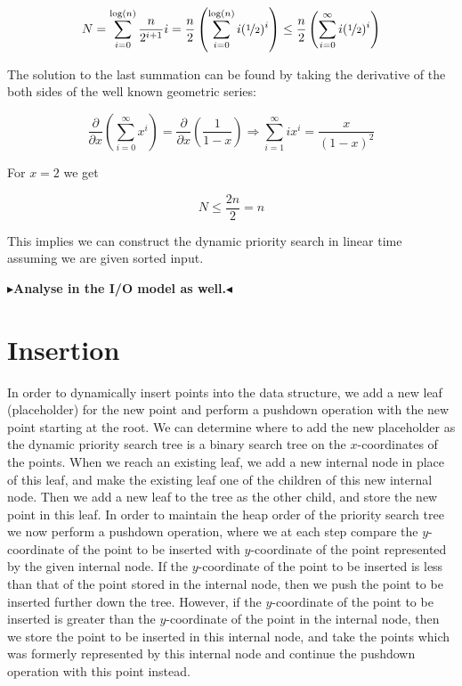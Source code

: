 \documentclass[twoside,11pt,openright]{report}
\newcommand{\todo}[1]{{\color[rgb]{.5,0,0}\textbf{$\blacktriangleright$#1$\blacktriangleleft$}}}
\begin{document}
$$ N = \sum\limits_{i=0}^{\log(n)} \frac{n}{2^{i+1}}i = \frac{n}{2} \left( \sum\limits_{i=0}^{\log(n)} i(\nicefrac{1}{2})^i \right) \leq \frac{n}{2} \left( \sum\limits_{i=0}^{\infty} i(\nicefrac{1}{2})^i \right)$$

The solution to the last summation can be found by taking the derivative of the both sides of the well known geometric series:

$$ \frac{\partial}{\partial x} \left( \sum\limits_{i=0}^{\infty} x^i \right) = \frac{\partial}{\partial x} \left( \frac{1}{1-x} \right) \Rightarrow \sum_{i=1}^{\infty} ix^i = \frac{x}{(1-x)^2} $$

For $x = 2$ we get

$$N \leq \frac{2n}{2} = n $$

This implies we can construct the dynamic priority search in linear time assuming we are given sorted input.

\todo{Analyse in the I/O model as well.}

\section{Insertion}

In order to dynamically insert points into the data structure, we add a new leaf (placeholder) for the new point and perform a pushdown operation with the new point starting at the root. We can determine where to add the new placeholder as the dynamic priority search tree is a binary search tree on the $x$-coordinates of the points. When we reach an existing leaf, we add a new internal node in place of this leaf, and make the existing leaf one of the children of this new internal node. Then we add a new leaf to the tree as the other child, and store the new point in this leaf. In order to maintain the heap order of the priority search tree we now perform a pushdown operation, where we at each step compare the $y$-coordinate of the point to be inserted with $y$-coordinate of the point represented by the given internal node. If the $y$-coordinate of the point to be inserted is less than that of the point stored in the internal node, then we push the point to be inserted further down the tree. However, if the $y$-coordinate of the point to be inserted is greater than the $y$-coordinate of the point in the internal node, then we store the point to be inserted in this internal node, and take the points which was formerly represented by this internal node and continue the pushdown operation with this point instead.
\end{document}
